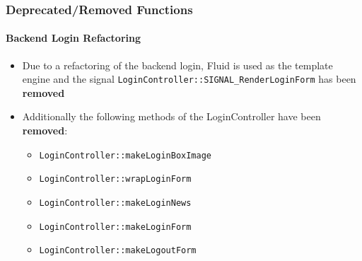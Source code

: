 \begin{frame}[fragile]
	\frametitle{Deprecated/Removed Functions}
	\framesubtitle{Backend Login Refactoring}

	\begin{itemize}

		\item Due to a refactoring of the backend login, Fluid is used as the template
			engine and the signal
			\small\texttt{LoginController::SIGNAL\_RenderLoginForm}\normalsize\space
			has been \textbf{removed}

		\item Additionally the following methods of the LoginController have been \textbf{removed}:

			\begin{itemize}
				\item \texttt{LoginController::makeLoginBoxImage}
				\item \texttt{LoginController::wrapLoginForm}
				\item \texttt{LoginController::makeLoginNews}
				\item \texttt{LoginController::makeLoginForm}
				\item \texttt{LoginController::makeLogoutForm}
			\end{itemize}

	\end{itemize}

\end{frame}


